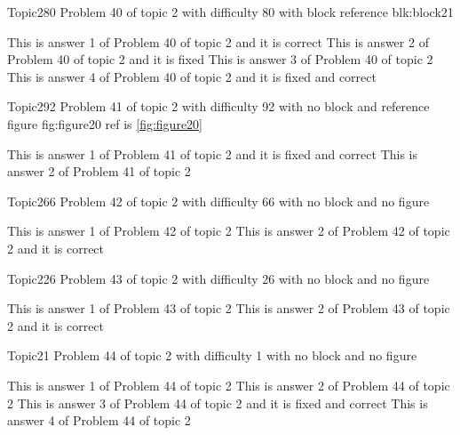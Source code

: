\documentclass[master]{exam}
\begin{document}
\begin{problem}[requires=blk:block21]{Topic2}{80}
	Problem 40 of topic 2 with difficulty 80 with block reference blk:block21
	\begin{answers}
		\answer[correct] This is answer 1 of Problem 40 of topic 2 and it is correct
		\answer[fixed] This is answer 2 of Problem 40 of topic 2 and it is fixed
		\answer This is answer 3 of Problem 40 of topic 2 
		 This is answer 4 of Problem 40 of topic 2 and it is fixed and correct
	\end{answers}
\end{problem}

\begin{problem}{Topic2}{92}
	Problem 41 of topic 2 with difficulty 92 with no block and reference figure fig:figure20 ref is \ref{fig:figure20}
	\begin{answers}
		 This is answer 1 of Problem 41 of topic 2 and it is fixed and correct
		\answer This is answer 2 of Problem 41 of topic 2 
	\end{answers}
\end{problem}

\begin{problem}{Topic2}{66}
	Problem 42 of topic 2 with difficulty 66 with no block and no figure
	\begin{answers}
		\answer This is answer 1 of Problem 42 of topic 2 
		\answer[correct] This is answer 2 of Problem 42 of topic 2 and it is correct
	\end{answers}
\end{problem}

\begin{problem}{Topic2}{26}
	Problem 43 of topic 2 with difficulty 26 with no block and no figure
	\begin{answers}
		\answer This is answer 1 of Problem 43 of topic 2 
		\answer[correct] This is answer 2 of Problem 43 of topic 2 and it is correct
	\end{answers}
\end{problem}

\begin{problem}{Topic2}{1}
	Problem 44 of topic 2 with difficulty 1 with no block and no figure
	\begin{answers}
		\answer This is answer 1 of Problem 44 of topic 2 
		\answer This is answer 2 of Problem 44 of topic 2 
		 This is answer 3 of Problem 44 of topic 2 and it is fixed and correct
		\answer This is answer 4 of Problem 44 of topic 2 
	\end{answers}
\end{problem}
\end{document}
